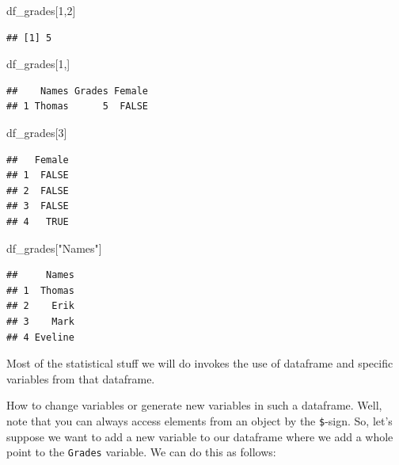 \documentclass[]{article}
\newenvironment{Shaded}{\begin{snugshade}}{\end{snugshade}}
\newcommand{\DecValTok}[1]{\textcolor[rgb]{0.00,0.00,0.81}{#1}}
\newcommand{\StringTok}[1]{\textcolor[rgb]{0.31,0.60,0.02}{#1}}
\newcommand{\NormalTok}[1]{#1}
\theoremstyle{definition}
\theoremstyle{definition}
\theoremstyle{definition}
\theoremstyle{remark}
\begin{document}
\begin{Shaded}
\begin{Highlighting}[]
\NormalTok{df_grades[}\DecValTok{1}\NormalTok{,}\DecValTok{2}\NormalTok{]}
\end{Highlighting}
\end{Shaded}

\begin{verbatim}
## [1] 5
\end{verbatim}

\begin{Shaded}
\begin{Highlighting}[]
\NormalTok{df_grades[}\DecValTok{1}\NormalTok{,]}
\end{Highlighting}
\end{Shaded}

\begin{verbatim}
##    Names Grades Female
## 1 Thomas      5  FALSE
\end{verbatim}

\begin{Shaded}
\begin{Highlighting}[]
\NormalTok{df_grades[}\DecValTok{3}\NormalTok{]}
\end{Highlighting}
\end{Shaded}

\begin{verbatim}
##   Female
## 1  FALSE
## 2  FALSE
## 3  FALSE
## 4   TRUE
\end{verbatim}

\begin{Shaded}
\begin{Highlighting}[]
\NormalTok{df_grades[}\StringTok{"Names"}\NormalTok{]}
\end{Highlighting}
\end{Shaded}

\begin{verbatim}
##     Names
## 1  Thomas
## 2    Erik
## 3    Mark
## 4 Eveline
\end{verbatim}

Most of the statistical stuff we will do invokes the use of dataframe
and specific variables from that dataframe.

How to change variables or generate new variables in such a dataframe.
Well, note that you can always access elements from an object by the
\texttt{\$}-sign. So, let's suppose we want to add a new variable to our
dataframe where we add a whole point to the \texttt{Grades} variable. We
can do this as follows:
\end{document}
